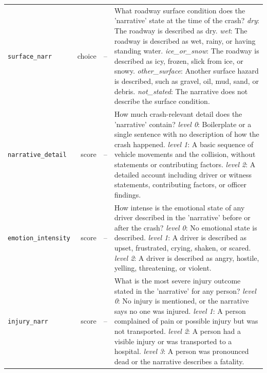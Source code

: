 \begin{small}
\begin{longtable}{lrr>{\raggedright\arraybackslash}p{267.2pt}}
\texttt{surface\_narr} & choice & -- & What roadway surface condition does the 'narrative' state at the time of the crash? \newline \textit{dry}: The roadway is described as dry. \newline \textit{wet}: The roadway is described as wet, rainy, or having standing water. \newline \textit{ice\_or\_snow}: The roadway is described as icy, frozen, slick from ice, or snowy. \newline \textit{other\_surface}: Another surface hazard is described, such as gravel, oil, mud, sand, or debris. \newline \textit{not\_stated}: The narrative does not describe the surface condition. \\
\texttt{narrative\_detail} & score & -- & How much crash-relevant detail does the 'narrative' contain? \newline \textit{level 0}: Boilerplate or a single sentence with no description of how the crash happened. \newline \textit{level 1}: A basic sequence of vehicle movements and the collision, without statements or contributing factors. \newline \textit{level 2}: A detailed account including driver or witness statements, contributing factors, or officer findings. \\
\texttt{emotion\_intensity} & score & -- & How intense is the emotional state of any driver described in the 'narrative' before or after the crash? \newline \textit{level 0}: No emotional state is described. \newline \textit{level 1}: A driver is described as upset, frustrated, crying, shaken, or scared. \newline \textit{level 2}: A driver is described as angry, hostile, yelling, threatening, or violent. \\
\texttt{injury\_narr} & score & -- & What is the most severe injury outcome stated in the 'narrative' for any person? \newline \textit{level 0}: No injury is mentioned, or the narrative says no one was injured. \newline \textit{level 1}: A person complained of pain or possible injury but was not transported. \newline \textit{level 2}: A person had a visible injury or was transported to a hospital. \newline \textit{level 3}: A person was pronounced dead or the narrative describes a fatality. \\

\end{longtable}
\end{small}
